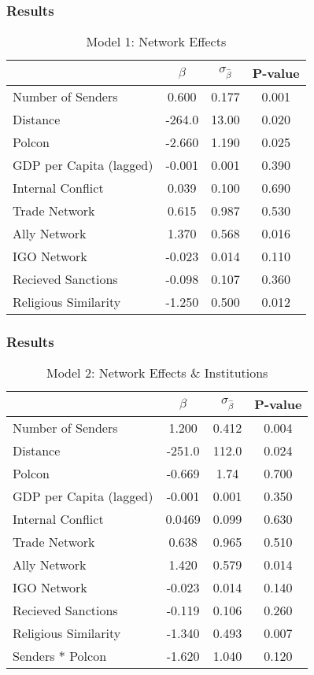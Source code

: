 \documentclass{beamer}
\begin{document}
\begin{frame}
\frametitle{Results}

\begin{table}
\caption{Model 1: Network Effects}
\begin{tabular}{lccc}
\hline
& $\beta$ & $\sigma_{\hat{\beta}}$ & P-value \\
\hline
Number of Senders &  0.600 & 0.177 & 0.001 \\ 
Distance & -264.0 & 13.00 & 0.020 \\
Polcon & -2.660 &  1.190 & 0.025 \\
GDP per Capita (lagged) & -0.001 & 0.001 &  0.390 \\
Internal Conflict & 0.039 &  0.100 & 0.690 \\
Trade Network & 0.615 & 0.987 & 0.530 \\
Ally Network & 1.370 & 0.568 & 0.016 \\
IGO Network &  -0.023 & 0.014 & 0.110 \\
Recieved Sanctions & -0.098 & 0.107 & 0.360 \\
Religious Similarity &  -1.250 & 0.500  & 0.012 \\
\hline
\end{tabular}
\end{table}

\end{frame}


\begin{frame}
\frametitle{Results}

\begin{table}
\caption{Model 2: Network Effects \& Institutions}
\begin{tabular}{lccc}
\hline
& $\beta$ & $\sigma_{\hat{\beta}}$ & P-value \\
\hline
Number of Senders &  1.200 & 0.412 & 0.004 \\ 
Distance & -251.0 & 112.0 & 0.024 \\
Polcon & -0.669 &  1.74 & 0.700 \\
GDP per Capita (lagged) & -0.001 &  0.001 &  0.350 \\
Internal Conflict & 0.0469 & 0.099 & 0.630 \\
Trade Network & 0.638 & 0.965 & 0.510 \\
Ally Network & 1.420 & 0.579 & 0.014 \\
IGO Network &  -0.023 & 0.014 & 0.140 \\
Recieved Sanctions & -0.119 & 0.106 & 0.260 \\
Religious Similarity &  -1.340 & 0.493  & 0.007 \\
Senders $*$ Polcon & -1.620 & 1.040 & 0.120 \\
\hline
\end{tabular}
\end{table}

\end{frame}
\end{document}

